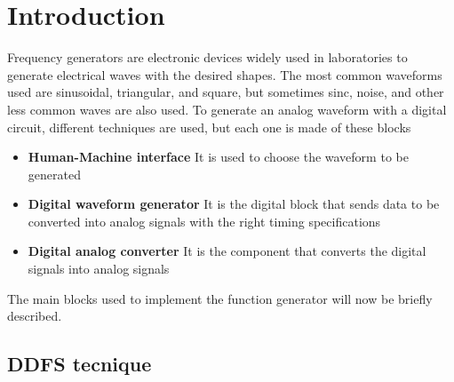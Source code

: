 \section{Introduction}
\label{sec:introduction}

Frequency generators are electronic devices widely used in laboratories to generate electrical waves with the desired shapes. The most common waveforms used are sinusoidal, triangular, and square, but sometimes sinc, noise, and other less common waves are also used.
To generate an analog waveform with a digital circuit, different techniques are used, but each one is made of these blocks

\begin{itemize}
        
    \item \textbf{Human-Machine interface} \newline
    It is used to choose the waveform to be generated

    \item \textbf{Digital waveform generator} \newline
    It is the digital block that sends data to be converted into analog signals with the right timing specifications

    \item \textbf{Digital analog converter} \newline
    It is the component that converts the digital signals into analog signals
        
\end{itemize}

\noindent
The main blocks used to implement the function generator will now be briefly described.

\subsection{DDFS tecnique}

